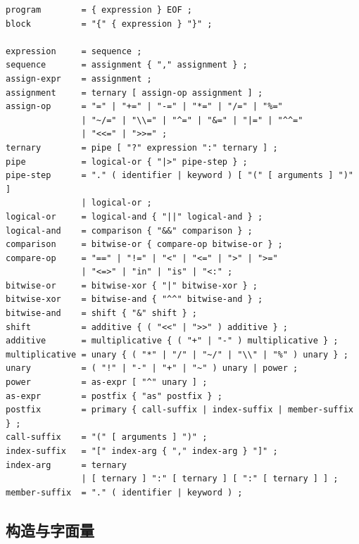 \documentclass[UTF8,12pt]{ctexart}
\begin{document}
\begin{lstlisting}
program        = { expression } EOF ;
block          = "{" { expression } "}" ;

expression     = sequence ;
sequence       = assignment { "," assignment } ;
assign-expr    = assignment ;
assignment     = ternary [ assign-op assignment ] ;
assign-op      = "=" | "+=" | "-=" | "*=" | "/=" | "%="
               | "~/=" | "\\=" | "^=" | "&=" | "|=" | "^^="
               | "<<=" | ">>=" ;
ternary        = pipe [ "?" expression ":" ternary ] ;
pipe           = logical-or { "|>" pipe-step } ;
pipe-step      = "." ( identifier | keyword ) [ "(" [ arguments ] ")" ]
               | logical-or ;
logical-or     = logical-and { "||" logical-and } ;
logical-and    = comparison { "&&" comparison } ;
comparison     = bitwise-or { compare-op bitwise-or } ;
compare-op     = "==" | "!=" | "<" | "<=" | ">" | ">="
               | "<=>" | "in" | "is" | "<:" ;
bitwise-or     = bitwise-xor { "|" bitwise-xor } ;
bitwise-xor    = bitwise-and { "^^" bitwise-and } ;
bitwise-and    = shift { "&" shift } ;
shift          = additive { ( "<<" | ">>" ) additive } ;
additive       = multiplicative { ( "+" | "-" ) multiplicative } ;
multiplicative = unary { ( "*" | "/" | "~/" | "\\" | "%" ) unary } ;
unary          = ( "!" | "-" | "+" | "~" ) unary | power ;
power          = as-expr [ "^" unary ] ;
as-expr        = postfix { "as" postfix } ;
postfix        = primary { call-suffix | index-suffix | member-suffix } ;
call-suffix    = "(" [ arguments ] ")" ;
index-suffix   = "[" index-arg { "," index-arg } "]" ;
index-arg      = ternary
               | [ ternary ] ":" [ ternary ] [ ":" [ ternary ] ] ;
member-suffix  = "." ( identifier | keyword ) ;
\end{lstlisting}

\subsection{构造与字面量}
\end{document}
